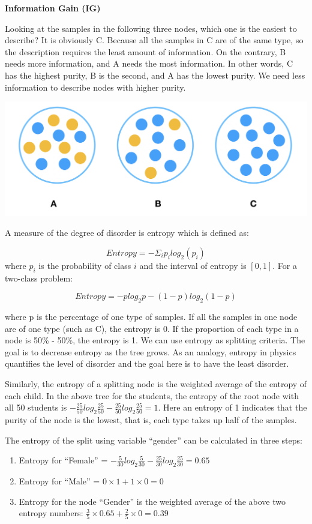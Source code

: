 \documentclass[12pt,]{krantz}
\providecommand{\tightlist}{%
  \setlength{\itemsep}{0pt}\setlength{\parskip}{0pt}}
\begin{document}
\textbf{Information Gain (IG)}

Looking at the samples in the following three nodes, which one is the easiest to describe? It is obviously C. Because all the samples in C are of the same type, so the description requires the least amount of information. On the contrary, B needs more information, and A needs the most information. In other words, C has the highest purity, B is the second, and A has the lowest purity. We need less information to describe nodes with higher purity.

\includegraphics{images/InfoGainEN.PNG}

A measure of the degree of disorder is entropy which is defined as:

\[Entropy = - \Sigma_i p_i log_2(p_i)\]
where \(p_i\) is the probability of class \(i\) and the interval of entropy is \([0, 1]\). For a two-class problem:

\[Entropy=-plog_{2}p-(1-p)log_{2}(1-p)\]

where p is the percentage of one type of samples. If all the samples in one node are of one type (such as C), the entropy is 0. If the proportion of each type in a node is 50\% - 50\%, the entropy is 1. We can use entropy as splitting criteria. The goal is to decrease entropy as the tree grows. As an analogy, entropy in physics quantifies the level of disorder and the goal here is to have the least disorder.

Similarly, the entropy of a splitting node is the weighted average of the entropy of each child. In the above tree for the students, the entropy of the root node with all 50 students is \(-\frac{25}{50}log_{2}\frac{25}{50}-\frac{25}{50}log_{2}\frac{25}{50}=1\). Here an entropy of 1 indicates that the purity of the node is the lowest, that is, each type takes up half of the samples.

The entropy of the split using variable ``gender'' can be calculated in three steps:

\begin{enumerate}
\def\labelenumi{\arabic{enumi}.}
\tightlist
\item
  Entropy for ``Female'' = \(-\frac{5}{30}log_{2}\frac{5}{30}-\frac{25}{30}log_{2}\frac{25}{30}=0.65\)
\item
  Entropy for ``Male'' = \(0\times1+1\times 0=0\)
\item
  Entropy for the node ``Gender'' is the weighted average of the above two entropy numbers: \(\frac{3}{5}\times 0.65+\frac{2}{5}\times 0=0.39\)
\end{enumerate}
\end{document}
